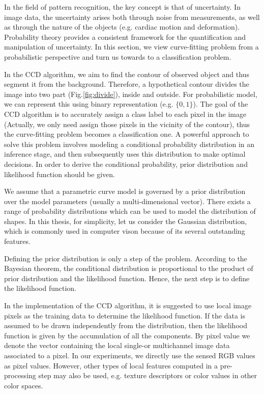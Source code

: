 \documentclass[conference]{IEEEtran}
\begin{document}
In the field of pattern recognition, the key concept is that of
uncertainty. In image data, the uncertainty arises both
through noise from measurements, as well as through the nature of
the objects (e.g. cardiac motion and deformation). Probability theory
provides a consistent framework for the quantification and
manipulation of uncertainty.  In this section, we view curve-fitting
problem from a probabilistic perspective and turn us towards to
a classification problem.

In the CCD algorithm, we aim to find the contour of observed object
and thus segment it from the background. Therefore, a hypothetical 
contour divides the image into two part (Fig.\ref{fig:divide}), inside
and outside. For probabilistic model, we can represent this using
binary representation (e.g. $\{0, 1\}$). The goal of the CCD algorithm
is to accurately
assign a class label to each pixel in the image (Actually, we only need assign those pixels in the vicinity of the
contour), thus the curve-fitting problem becomes a classification
one. A powerful approach to solve this problem involves modeling a
conditional probability distribution in an inference stage, and then
subsequently uses this distribution to make optimal decisions. In
order to derive the conditional probability, prior distribution and
likelihood function should be given.

We assume that a parametric curve model is governed by a prior distribution
over the model parameters (usually a multi-dimensional vector). There
exists a range of probability distributions which can be used to model
the distribution of shapes. In this thesis, for simplicity, let us
consider the Gaussian distribution, which is commonly used in computer
vison because of its several outstanding features. 

Defining the prior distribution is only a step of the problem.
According to the Bayesian theorem, the conditional distribution
is proportional to the product of prior distribution and the likelihood
function. Hence, the next step is to define the likelihood function.

In the implementation of the CCD algorithm, it is suggested to use
local image pixels as the training data to determine the
likelihood function. If the data is assumed to be drawn  independently
from the distribution, then the likelihood function is given by the accumulation of all the components.
By pixel value we denote the vector containing the local single-or multichannel
image data associated to a pixel. In our experiments, we directly use the sensed RGB
values as pixel values. However, other types of local features computed in a pre-processing
step may also be used, e.g. texture descriptors or color values in
other color spaces.
\end{document}
